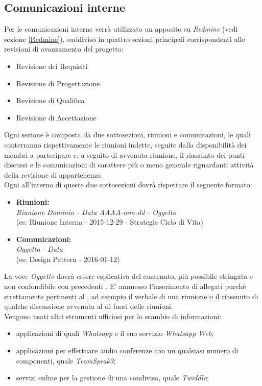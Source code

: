 \documentclass{scalatekids-article}
\begin{document}
\subsection{Comunicazioni interne}
\label{sec:Comunicazioni interne}
Per le comunicazioni interne verrà utilizzato un  apposito su
\textit{Redmine} (vedi sezione \ref{Redmine}), suddiviso in quattro sezioni
principali corrispondenti alle revisioni di avanzamento del progetto:
\begin{itemize}
\item Revisione dei Requisiti
\item Revisione di Progettazione
\item Revisione di Qualifica
\item Revisione di Accettazione
\end{itemize}
Ogni sezione è composta da due sottosezioni, riunioni e comunicazioni, le quali
conterranno rispettivamente le riunioni indette, seguite dalla disponibilità dei
membri a partecipare e, a seguito di avvenuta riunione, il riassunto dei punti
discussi e le comunicazioni di carattere più o meno generale riguardanti
attività della revisione di appartenenza.\\ Ogni  all'interno di
queste due sottosezioni dovrà rispettare il seguente formato:
\begin{itemize}
\item\textbf{Riunioni:}\\
  \textit{Riunione Dominio - Data AAAA-mm-dd - Oggetto}\\
  (es: Riunione Interna - 2015-12-29 - Strategie Ciclo di Vita)
\item\textbf{Comunicazioni:}\\
  \textit{Oggetto - Data}\\
  (es: Design Pattern - 2016-01-12)
\end{itemize}
La voce \textit{Oggetto} dovrà essere esplicativa del contenuto, più possibile
stringata e non confondibile con precedenti . E' ammesso
l'inserimento di allegati purchè strettamente pertinenti al , ad
esempio il verbale di una riunione o il riassunto di qualche discussione
avvenuta al di fuori delle riunioni.\\
Vengono usati altri strumenti ufficiosi per lo scambio di informazioni:
\begin{itemize}
\item applicazioni di  quali \textit{Whatsapp} e il suo servizio \textit{Whatsapp Web};
\item applicazioni  per effettuare audio conferenze con un qualsiasi numero di componenti, quale \textit{TeamSpeak3};
\item servizi online per la gestione di una  condivisa, quale \textit{Twiddla};
\end{itemize}
\end{document}
